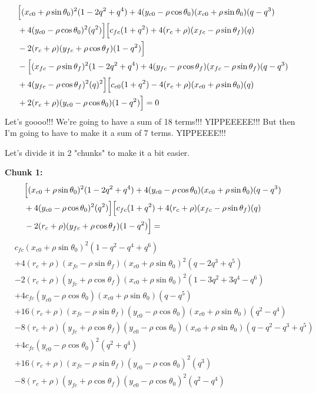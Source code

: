 \documentclass[12pt]{article}
\begin{document}
\begin{align*}
    &\Bigl[(x_{c0} + \rho\sin\theta_0)^2(1-2q^2 + q^4) + 4(y_{c0} - \rho\cos\theta_0)(x_{c0} + \rho\sin\theta_0)(q-q^3)\\&+ 4(y_{c0} - \rho\cos\theta_0)^2(q^2) \Bigr] \Bigl[c_{fc}(1 + q^2) + 4(r_c+\rho)(x_{fc} - \rho\sin\theta_f)(q)\\
    & -2(r_c+\rho)(y_{fc} + \rho\cos\theta_f)(1 - q^2) \Bigr]\\
    &- \Bigl[ (x_{fc} - \rho\sin\theta_f)^2(1-2q^2 + q^4) + 4(y_{fc} - \rho\cos\theta_f)(x_{fc} - \rho\sin\theta_f)(q-q^3)\\&+ 4(y_{fc} - \rho\cos\theta_f)^2(q)^2 \Bigr] \Bigl[ c_{c0}(1 + q^2) - 4(r_c+\rho)(x_{c0} +\rho\sin\theta_0)(q)\\
    &+ 2(r_c+\rho)(y_{c0} - \rho\cos\theta_0)(1 - q^2) \Bigr] = 0
\end{align*}
Let's goooo!!! We're going to have a sum of 18 terms!!! YIPPEEEEE!!! But then I'm going to have to make it a sum of 7 terms. YIPPEEEE!!!

Let's divide it in 2 "chunks" to make it a bit easier.

\textbf{Chunk 1:}
\begin{align*}
    &\Bigl[(x_{c0} + \rho\sin\theta_0)^2(1-2q^2 + q^4) + 4(y_{c0} - \rho\cos\theta_0)(x_{c0} + \rho\sin\theta_0)(q-q^3)\\&+ 4(y_{c0} - \rho\cos\theta_0)^2(q^2) \Bigr] \Bigl[c_{fc}(1 + q^2) + 4(r_c+\rho)(x_{fc} - \rho\sin\theta_f)(q)\\
    & -2(r_c+\rho)(y_{fc} + \rho\cos\theta_f)(1 - q^2) \Bigr] =
\end{align*}
\begin{align*}
    &c_{fc}(x_{c0} + \rho\sin\theta_0)^2(1-q^2 -q^4 + q^6)\\
    &+ 4(r_c+\rho)(x_{fc} - \rho\sin\theta_f)(x_{c0} + \rho\sin\theta_0)^2(q-2q^3 + q^5)\\
    & -2(r_c+\rho)(y_{fc} + \rho\cos\theta_f)(x_{c0} + \rho\sin\theta_0)^2(1 -3q^2 + 3q^4 - q^6) \\
    &+ 4c_{fc}(y_{c0} - \rho\cos\theta_0)(x_{c0} + \rho\sin\theta_0)(q-q^5) \\
    &+ 16(r_c+\rho)(x_{fc} - \rho\sin\theta_f)(y_{c0} - \rho\cos\theta_0)(x_{c0} + \rho\sin\theta_0)(q^2-q^4)\\
    & -8(r_c+\rho)(y_{fc} + \rho\cos\theta_f)(y_{c0} - \rho\cos\theta_0)(x_{c0} + \rho\sin\theta_0)(q-q^2 - q^3 + q^5) \\
    &+ 4c_{fc}(y_{c0} - \rho\cos\theta_0)^2(q^2 + q^4)\\
    &+ 16(r_c+\rho)(x_{fc} - \rho\sin\theta_f)(y_{c0} - \rho\cos\theta_0)^2(q^3)\\
    & -8(r_c+\rho)(y_{fc} + \rho\cos\theta_f)(y_{c0} - \rho\cos\theta_0)^2(q^2 - q^4)
\end{align*}
\end{document}
